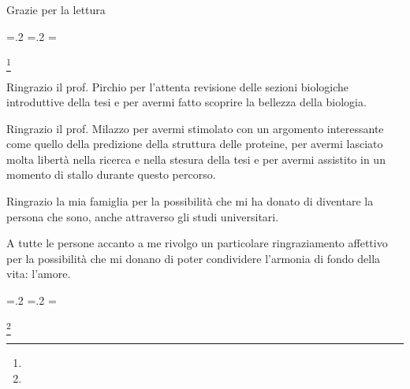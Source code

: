 
\vspace*{\fill}
\begin{center}
Grazie per la lettura \newline\newline
\end{center}
\begin{list}{}{
		\leftmargin=.2\textwidth
		\rightmargin=.2\textwidth
		\listparindent=\parindent
		\itemsep=0pt
		\parsep=0pt}
	\item\relax
	\footnote{} \\
	
	
\end{list}
\vfill %

Ringrazio il prof. Pirchio per l'attenta revisione delle sezioni biologiche introduttive della tesi e per avermi fatto scoprire la bellezza della biologia.
\par Ringrazio il prof. Milazzo per avermi stimolato con un argomento interessante come quello della predizione della struttura delle proteine, per avermi lasciato molta libertà nella ricerca e nella stesura della tesi e per avermi assistito in un momento di stallo durante questo percorso.
\par Ringrazio la mia famiglia per la possibilità che mi ha donato di diventare la persona che sono, anche attraverso gli studi universitari.
\par A tutte le persone accanto a me rivolgo un particolare ringraziamento affettivo per la possibilità che mi donano di poter condividere l'armonia di fondo della vita: l'amore.\\


\begin{list}{}{
		\leftmargin=.2\textwidth
		\rightmargin=.2\textwidth
		\listparindent=\parindent
		\itemsep=0pt
		\parsep=0pt}
	\item\relax
		\footnote{}
	
\end{list}


\vfill

\clearpage



\clearpage